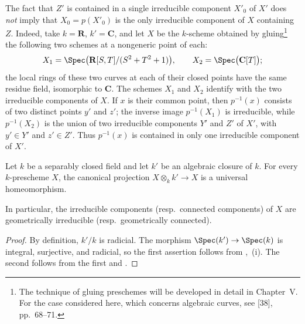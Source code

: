 \begin{remark}[4.5.20]
\label{IV.4.5.20}
The fact that $Z'$ is contained in a single irreducible component
$X'_0$ of $X'$ does \emph{not} imply that
$X_0=p(X'_0)$ is the only irreducible component of $X$ containing
$Z$.
Indeed, take $k=\mathbf R$, $k'=\mathbf C$, and let $X$ be the
$k$-scheme obtained by gluing\footnote{The technique of gluing
preschemes will be developed in detail in Chapter~V.  For the case
considered here, which concerns algebraic curves, see [38],
pp.~68--71.} the following two schemes at a nongeneric point of each:
\[
X_1=\Spec\bigl(\mathbf R[S,T]/(S^2+T^2+1)\bigr),
\qquad
X_2=\Spec\bigl(\mathbf C[T]\bigr);
\]
the local rings of these two curves at each of their closed points
have the same residue field, isomorphic to $\mathbf C$.
The schemes $X_1$ and $X_2$ identify with the two irreducible
components of $X$.
If $x$ is their common point, then $p^{-1}(x)$ consists of two
distinct points $y'$ and $z'$; the inverse image $p^{-1}(X_1)$ is
irreducible, while $p^{-1}(X_2)$ is the union of two irreducible
components $Y'$ and $Z'$ of $X'$, with $y'\in Y'$ and $z'\in Z'$.
Thus $p^{-1}(x)$ is contained in only one irreducible component of
$X'$.
\end{remark}

\begin{proposition}[4.5.21]
\label{IV.4.5.21}
Let $k$ be a separably closed field and let $k'$ be an algebraic
closure of $k$.
For every $k$-prescheme $X$, the canonical projection $X\otimes_k k'\longrightarrow X$
is a universal homeomorphism.


In particular, the irreducible components \textup{(resp.\ }connected
components\textup{)} of $X$ are geometrically irreducible
\textup{(resp.\ }geometrically connected\textup{)}.
\end{proposition}

\begin{proof}
By definition, $k'/k$ is radicial.
The morphism $\Spec(k')\to\Spec(k)$ is integral, surjective, and
radicial, so the first assertion follows from
,~(i).
The second follows from the first and .
\end{proof}

